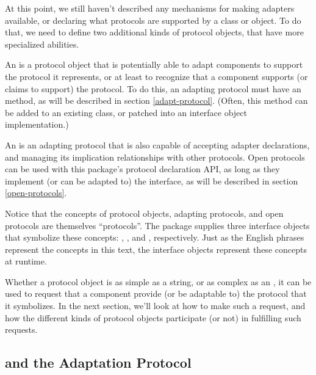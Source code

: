 \begin{verbatim%
}
\begin{verbatim%
}
At this point, we still haven't described any mechanisms for making adapters
available, or declaring what protocols are supported by a class or object.
To do that, we need to define two additional kinds of protocol objects, that
have more specialized abilities.

An  is a protocol object that is potentially able to
adapt components to support the protocol it represents, or at least to
recognize that a component supports (or claims to support) the protocol.  To
do this, an adapting protocol must have an  method, as
will be described in section \ref{adapt-protocol}.  (Often, this method
can be added to an existing class, or patched into an interface object
implementation.)



An  is an adapting protocol that is also capable of
accepting adapter declarations, and managing its implication relationships
with other protocols.  Open protocols can be used with this package's
protocol declaration API, as long as they implement (or can be adapted to)
the  interface, as will be described in section
\ref{open-protocols}.

Notice that the concepts of protocol objects, adapting protocols, and open
protocols are themselves ``protocols''.  The  package supplies
three interface objects that symbolize these concepts: ,
, and , respectively.  Just as
the English phrases represent the concepts in this text, the interface objects
represent these concepts at runtime.

Whether a protocol object is as simple as a string, or as complex as an
, it can be used to request that a component provide
(or be adaptable to) the protocol that it symbolizes.  In the next section,
we'll look at how to make such a request, and how the different kinds of
protocol objects participate (or not) in fulfilling such requests.






















\subsection{ and the Adaptation Protocol
\label{adapt-protocol}}


\end{verbatim%
}
\end{verbatim%
}
